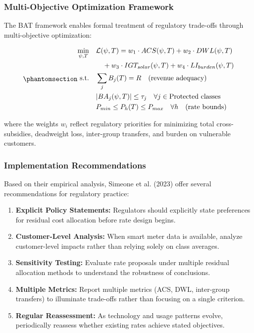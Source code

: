 \documentclass[
  11pt,
]{article}
\begin{document}
\subsubsection{Multi-Objective Optimization
Framework}\label{multi-objective-optimization-framework}

The BAT framework enables formal treatment of regulatory trade-offs
through multi-objective optimization:

\begin{equation}\phantomsection\label{eq-optimization}{\begin{align}
\min_{\psi, T} \quad & \mathcal{L}(\psi, T) = w_1 \cdot ACS(\psi, T) + w_2 \cdot DWL(\psi, T) \\
& \quad + w_3 \cdot IGT_{solar}(\psi, T) + w_4 \cdot LI_{burden}(\psi, T) \\
\text{s.t.} \quad & \sum_j B_j(T) = R \quad \text{(revenue adequacy)} \\
& |BA_j(\psi, T)| \leq \tau_j \quad \forall j \in \text{Protected classes} \\
& P_{min} \leq P_h(T) \leq P_{max} \quad \forall h \quad \text{(rate bounds)}
\end{align}}\end{equation}

where the weights \(w_i\) reflect regulatory priorities for minimizing
total cross-subsidies, deadweight loss, inter-group transfers, and
burden on vulnerable customers.

\subsubsection{Implementation
Recommendations}\label{implementation-recommendations}

Based on their empirical analysis, Simeone et al. (2023) offer several
recommendations for regulatory practice:

\begin{enumerate}
\def\labelenumi{\arabic{enumi}.}
\item
  \textbf{Explicit Policy Statements:} Regulators should explicitly
  state preferences for residual cost allocation before rate design
  begins.
\item
  \textbf{Customer-Level Analysis:} When smart meter data is available,
  analyze customer-level impacts rather than relying solely on class
  averages.
\item
  \textbf{Sensitivity Testing:} Evaluate rate proposals under multiple
  residual allocation methods to understand the robustness of
  conclusions.
\item
  \textbf{Multiple Metrics:} Report multiple metrics (ACS, DWL,
  inter-group transfers) to illuminate trade-offs rather than focusing
  on a single criterion.
\item
  \textbf{Regular Reassessment:} As technology and usage patterns
  evolve, periodically reassess whether existing rates achieve stated
  objectives.
\end{enumerate}
\end{document}
